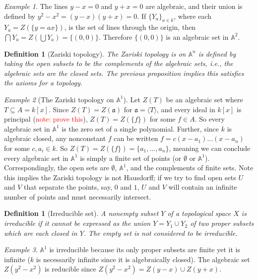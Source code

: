 \documentclass[12pt]{amsart}
\newcommand{\An}{\mathbb{A}^n}
\newtheorem{definition}[theorem]{Definition}
\theoremstyle{remark}
\theoremstyle{remark}
\newtheorem*{example}{Example}
\begin{document}
\begin{example}
The lines $y - x = 0$ and $y + x = 0$ are algebraic, and their union is defined by $y^2 - x^2 = (y-x)(y+x) = 0$.
If $\{Y_a\}_{a \in k}$, where each $Y_a = Z(\{y=ax\})$, is the set of lines through the origin, then $\bigcap Y_a = Z \left(\bigcup Y_a\right) = \{(0, 0)\}$.
Therefore $\{(0, 0)\}$ is an algebraic set in $\mathbb{A}^2$. 
\end{example}

\begin{definition}[Zariski topology]
The Zariski topology is on $\An$ is defined by taking the open subsets to be the complements of the algebraic sets, i.e., the algebraic sets are the closed sets.
The previous proposition implies this satisfies the axioms for a topology.
\end{definition}

\begin{example}[The Zariski topology on $\mathbb{A}^1$]
Let $Z(T)$ be an algebraic set where $T \subseteq A = k[x]$.
Since $Z(T) = Z(\mathfrak{a})$ for $\mathfrak{a} = \langle T \rangle$, and every ideal in $k[x]$ is principal (\textcolor{red}{note: prove this}), $Z(T) = Z(\{f\})$ for some $f \in A$.
So every algebraic set in $\mathbb{A}^1$ is the zero set of a single polynomial.
Further, since $k$ is algebraic closed, any nonconstant $f$ can be written $f = c(x - a_1) \dots (x-a_n)$ for some $c, a_i \in k$.
So $Z(T) = Z(\{f\}) = \{a_1, \ldots, a_n\}$, meaning we can conclude every algebraic set in $\mathbb{A}^1$ is simply a finite set of points (or $\emptyset$ or $\mathbb{A}^1$).
Correspondingly, the open sets are $\emptyset$, $\mathbb{A}^1$, and the complements of finite sets.
Note this implies the Zariski topology is not Hausdorff;
if we try to find open sets $U$ and $V$ that separate the points, say, $0$ and $1$, $U$ and $V$ will contain an infinite number of points and must necessarily intersect.
\end{example}

\begin{definition}[Irreducible set]
A nonempty subset $Y$ of a topological space $X$ is irreducible if it cannot be expressed as the union $Y = Y_1 \cup Y_2$ of two proper subsets which are each closed in $Y$.
The empty set is not considered to be irreducible.
\end{definition}

\begin{example}
$\mathbb{A}^1$ is irreducible because its only proper subsets are finite yet it is infinite ($k$ is necessarily infinite since it is algebraically closed).
The algebraic set $Z(y^2 - x^2)$ is reducible since $Z(y^2 - x^2) = Z(y - x) \cup Z(y +x)$.
\end{example}
\end{document}
